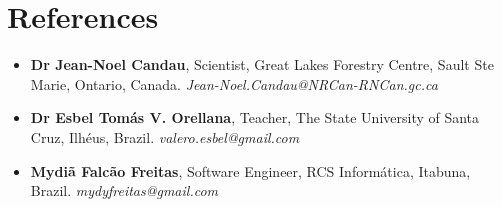 \documentclass[10pt, a4paper, oneside, final]{scrartcl} %
\begin{document}

\section{References}

\begin{itemize} \itemsep2pt \parskip0pt 
\item \textbf{Dr Jean-Noel Candau}, Scientist, Great Lakes Forestry Centre, Sault Ste Marie, Ontario, Canada. \textit{Jean-Noel.Candau@NRCan-RNCan.gc.ca}

\item \textbf{Dr Esbel Tomás V. Orellana}, Teacher, The State University of Santa Cruz, Ilhéus, Brazil. \textit{valero.esbel@gmail.com} 

\item \textbf{Mydiã Falcão Freitas}, Software Engineer, RCS Informática, Itabuna, Brazil. \textit{mydyfreitas@gmail.com} 
\end{itemize}

\end{document}
